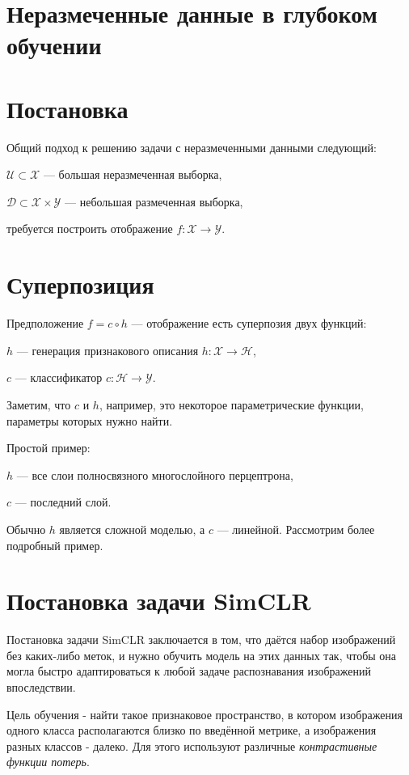 \section*{Неразмеченные данные в глубоком обучении}

\section{Постановка}
\hspace{2em}Общий подход к решению задачи с неразмеченными данными следующий:

$\mathcal{U} \subset \mathcal{X}$ --- большая неразмеченная выборка,

$\mathcal{D} \subset  \mathcal{X}\times \mathcal{Y}$ --- небольшая размеченная выборка,

требуется построить отображение $f: \mathcal{X} \to \mathcal{Y}$.

\section{Суперпозиция}
\hspace{2em}Предположение $f = c  \circ  h$ --- отображение есть суперпозия двух функций:

$h$ --- генерация признакового описания $h: \mathcal{X} \to \mathcal{H}$,

$c$ --- классификатор $c: \mathcal{H} \to \mathcal{Y}$.

Заметим, что $c$ и $h$, например, это некоторое параметрические функции, параметры которых нужно найти.

Простой пример:

$h$ --- все слои полносвязного многослойного перцептрона,

$c$ --- последний слой.

Обычно $h$ является сложной моделью, а $c$ --- линейной. Рассмотрим более подробный пример.

\section{Постановка задачи SimCLR}

\hspace{2em}Постановка задачи SimCLR заключается в том, что даётся набор изображений без каких-либо меток, и нужно обучить модель на этих данных так, чтобы она могла быстро адаптироваться к любой задаче распознавания изображений впоследствии.

Цель обучения - найти такое признаковое пространство, в котором изображения одного класса располагаются близко по введённой метрике, а изображения разных классов - далеко. Для этого используют различные \textit{контрастивные функции потерь}.

